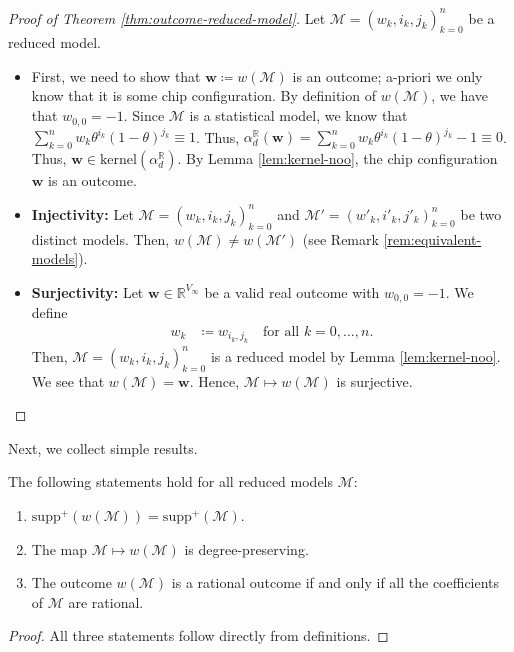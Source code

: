 \begin{proof}[Proof of Theorem \ref{thm:outcome-reduced-model}]
    Let \( \mathcal{M} = (w_k,i_k,j_k)_{k=0}^n \) be a reduced model. 

    \begin{itemize}
        \item First, we need to show that \( \mathbf w \coloneqq w(\mathcal{M}) \) is an outcome; a-priori we only know that it is some chip configuration. By definition of \( w(\mathcal{M}) \), we have that \( w_{0,0} = -1 \). Since \( \mathcal{M} \) is a statistical model, we know that \( \sum_{k=0}^n w_k \theta^{i_k} (1-\theta)^{j_k} \equiv 1 \). Thus, \( \alpha_d^{\mathbb R}(\mathbf w) = \sum_{k=0}^n w_k \theta^{i_k} (1-\theta)^{j_k} -1 \equiv 0 \). Thus, \( \mathbf{w} \in \mathrm{kernel}(\alpha_d^{\mathbb R}) \). By Lemma \ref{lem:kernel-noo}, the chip configuration \( \mathbf w \) is an outcome.
        
        \item \textbf{Injectivity:} Let \( \mathcal{M} = (w_k,i_k,j_k)^n_{k=0} \) and \( \mathcal{M}' = (w'_k,i'_k,j'_k)^n_{k=0} \) be two distinct models. Then, \( w(\mathcal{M}) \neq w(\mathcal{M}') \) (see Remark \ref{rem:equivalent-models}). 
        
        \item \textbf{Surjectivity:} Let \( \mathbf w \in \mathbb{R}^{V_\infty} \) be a valid real outcome with \( w_{0,0} = -1 \). We define 
        \begin{align*}
            w_k &\coloneqq w_{i_k,j_k} \quad \text{for all } k = 0, \dots, n.
        \end{align*}
        Then, \( \mathcal{M}= (w_k,i_k,j_k)^n_{k=0} \) is a reduced model by Lemma \ref{lem:kernel-noo}. We see that \( w(\mathcal{M}) = \mathbf w \). Hence, \( \mathcal{M} \mapsto w(\mathcal{M}) \) is surjective.
    \end{itemize}
\end{proof}

Next, we collect simple results.

\begin{proposition}
    The following statements hold for all reduced models \( \mathcal{M} \):
    \begin{enumerate}
        \item \( \mathrm{supp}^+(w(\mathcal{M})) = \mathrm{supp}^+(\mathcal{M})\).
        \item The map \( \mathcal{M} \mapsto w(\mathcal{M}) \) is degree-preserving.
        \item The outcome \( w(\mathcal{M}) \) is a rational outcome if and only if all the coefficients of \( \mathcal{M} \) are rational.
    \end{enumerate}
\end{proposition}

\begin{proof}
    All three statements follow directly from definitions.
\end{proof}